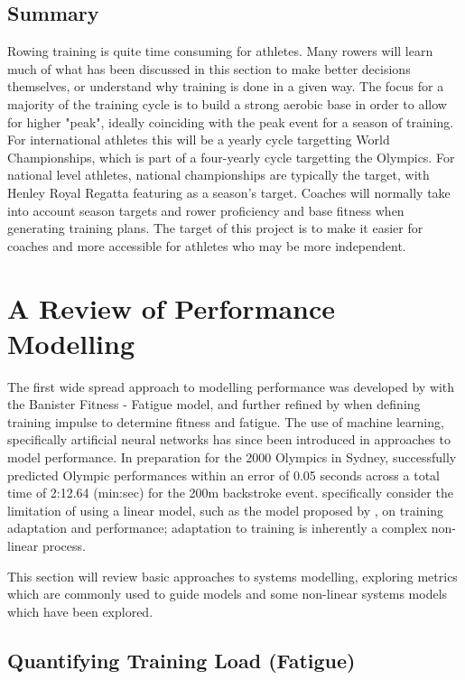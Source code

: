 \subsection{Summary}
Rowing training is quite time consuming for athletes. Many rowers will learn much of what has been discussed in this section to make better decisions themselves, or understand why training is done in a given way. The focus for a majority of the training cycle is to build a strong aerobic base in order to allow for higher "peak", ideally coinciding with the peak event for a season of training. For international athletes this will be a yearly cycle targetting World Championships, which is part of a four-yearly cycle targetting the Olympics. For national level athletes, national championships are typically the target, with Henley Royal Regatta featuring as a season's target. Coaches will normally take into account season targets and rower proficiency and base fitness when generating training plans. The target of this project is to make it easier for coaches and more accessible for athletes who may be more independent. 

\section{A Review of Performance Modelling}
The first wide spread approach to modelling performance was developed by \textcite{Bannister1976} with the Banister Fitness - Fatigue model, and further refined by \textcite{Morton1990} when defining training impulse to determine fitness and fatigue. The use of machine learning, specifically artificial neural networks has since been introduced in approaches to model performance. In preparation for the 2000 Olympics in Sydney, \textcite{Edelmannnusser2002} successfully predicted Olympic performances within an error of 0.05 seconds across a total time of 2:12.64 (min:sec) for the 200m backstroke event. \textcite{Edelmannnusser2002} specifically consider the limitation of using a linear model, such as the model proposed by \textcite{Bannister1976}, on training adaptation and performance; adaptation to training is inherently a complex non-linear process. 

This section will review basic approaches to systems modelling, exploring metrics which are commonly used to guide models and some non-linear systems models which have been explored. 

\subsection{Quantifying Training Load (Fatigue)}
